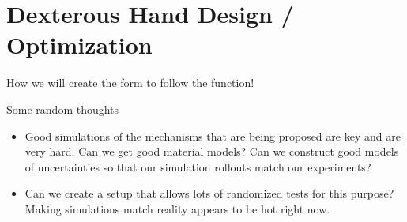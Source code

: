 \section{Dexterous Hand Design / Optimization}

How we will create the form to follow the function!

Some random thoughts
\begin{itemize}

  \item Good simulations of the mechanisms that are being proposed are key and are very hard.   Can we get good material models?    Can we construct good models of uncertainties so that our simulation rollouts match our experiments?

  \item Can we create a setup that allows lots of randomized tests for this purpose?    Making simulations match reality appears to be hot right now.
  
\end{itemize}

